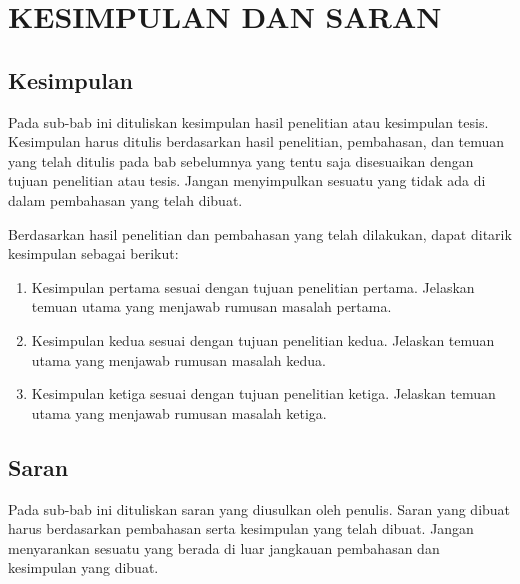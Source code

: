 
\chapter{KESIMPULAN DAN SARAN}

\section{Kesimpulan}

Pada sub-bab ini dituliskan kesimpulan hasil penelitian atau kesimpulan tesis. Kesimpulan harus ditulis berdasarkan hasil penelitian, pembahasan, dan temuan yang telah ditulis pada bab sebelumnya yang tentu saja disesuaikan dengan tujuan penelitian atau tesis. Jangan menyimpulkan sesuatu yang tidak ada di dalam pembahasan yang telah dibuat.

Berdasarkan hasil penelitian dan pembahasan yang telah dilakukan, dapat ditarik kesimpulan sebagai berikut:

\begin{enumerate}
    \item Kesimpulan pertama sesuai dengan tujuan penelitian pertama. Jelaskan temuan utama yang menjawab rumusan masalah pertama.
    
    \item Kesimpulan kedua sesuai dengan tujuan penelitian kedua. Jelaskan temuan utama yang menjawab rumusan masalah kedua.
    
    \item Kesimpulan ketiga sesuai dengan tujuan penelitian ketiga. Jelaskan temuan utama yang menjawab rumusan masalah ketiga.
\end{enumerate}

\section{Saran}

Pada sub-bab ini dituliskan saran yang diusulkan oleh penulis. Saran yang dibuat harus berdasarkan pembahasan serta kesimpulan yang telah dibuat. Jangan menyarankan sesuatu yang berada di luar jangkauan pembahasan dan kesimpulan yang dibuat.
